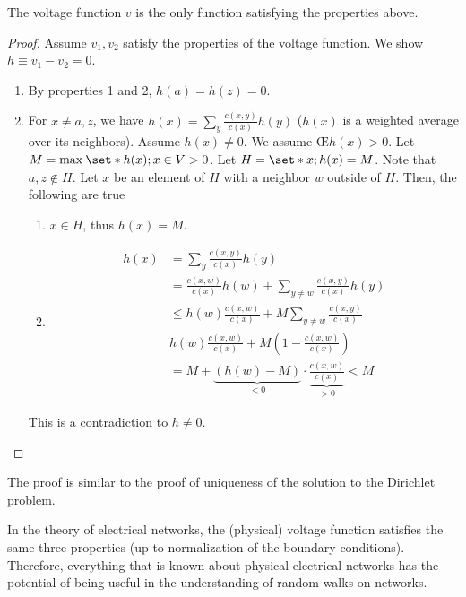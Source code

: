 \begin{lem}
    The voltage function $v$ is the only function satisfying the properties above.
\end{lem}
\begin{proof}
    Assume $v_1,v_2$ satisfy the properties of the voltage function. We show $h \equiv v_1-v_2=0$. 
    \begin{enumerate}
      \item By properties 1 and 2, $h(a)=h(z)=0$. 
      \item For $x\neq a,z$, we have \(h(x) = \sum_y \frac{c(x,y)}{c(x)} h(y)\) ($h(x)$ is a weighted average over its neighbors). Assume $h(x) \neq 0$. We assume \OE $h(x) >0$. Let \(M=\max_{}\set*{h(x); x\in V}>0\). Let \(H= \set*{x; h(x)=M}\). Note that $a,z \notin H$. Let $x$ be an element of $H$ with a neighbor $w$ outside of  $H$. Then, the following are true
        \begin{enumerate}
            \item $x\in H$, thus $h(x)=M$.
            \item 
              \begin{align*}
                h(x)  &=\sum_y \frac{c(x,y)}{c(x)} h(y) \\
                     &=\frac{c(x,w)}{c(x)}h(w) + \sum_{y\neq w} \frac{c(x,y)}{c(x)}h(y) \\
                     &\leq h(w) \frac{c(x,w)}{c(x)} + M \sum_{y\neq w} \frac{c(x,y)}{c(x)} \\
                     & h(w) \frac{c(x,w)}{c(x)} + M \left(1-\frac{c(x,w)}{c(x)}\right) \\
                     &=M + \underbrace{ \left(h(w)-M\right)}_{<0}\cdot \underbrace{\frac{c(x,w)}{c(x)}}_{>0} < M
              \end{align*}
              
        \end{enumerate}
        This is a contradiction to $h \neq 0$.
    \end{enumerate}
\end{proof}

\begin{remark}
    The proof is similar to the proof of uniqueness of the solution to the Dirichlet problem.
\end{remark}

\begin{remark}
    In the theory of electrical networks, the (physical) voltage function satisfies the same three properties (up to normalization of the boundary conditions). Therefore, everything that is known about physical electrical networks has the potential of being useful in the understanding of random walks on networks.
\end{remark}


